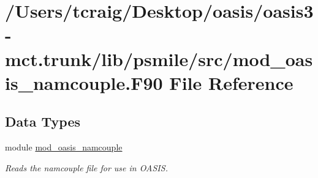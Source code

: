 \hypertarget{mod__oasis__namcouple_8_f90}{\section{/\+Users/tcraig/\+Desktop/oasis/oasis3-\/mct.trunk/lib/psmile/src/mod\+\_\+oasis\+\_\+namcouple.F90 File Reference}
\label{mod__oasis__namcouple_8_f90}
}
\subsection*{Data Types}
\begin{DoxyCompactItemize}
\item 
module \hyperlink{classmod__oasis__namcouple}{mod\+\_\+oasis\+\_\+namcouple}
\begin{DoxyCompactList}\small\item\em Reads the namcouple file for use in O\+A\+S\+I\+S. \end{DoxyCompactList}\end{DoxyCompactItemize}
